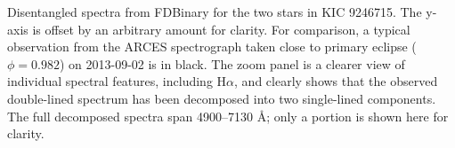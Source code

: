 \label{fig:twospectra} Disentangled spectra from FDBinary for the two stars in KIC 9246715. The y-axis is offset by an arbitrary amount for clarity. For comparison, a typical observation from the ARCES spectrograph taken close to primary eclipse ($\phi = 0.982$) on 2013-09-02 is in black. The zoom panel is a clearer view of individual spectral features, including $\textrm{H}\alpha$, and clearly shows that the observed double-lined spectrum has been decomposed into two single-lined components. The full decomposed spectra span 4900--7130 \AA; only a portion is shown here for clarity.
  
  
  